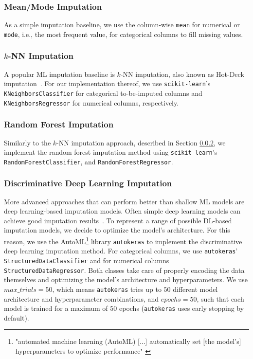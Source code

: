 \documentclass[utf8]{frontiersSCNS} %
\newcommand{\code}[1]{\texttt{#1}}
\begin{document}
\subsubsection{Mean/Mode Imputation}
\label{sec:simple_imputation}
%
As a simple imputation baseline, we use the column-wise \code{mean} for numerical or \code{mode}, i.e., the most frequent value,  for categorical columns to fill missing values.


\subsubsection{$k$-NN Imputation}
\label{sec:knKNN}
%
A popular ML imputation baseline is $k$-NN imputation, also known as Hot-Deck imputation~\citep{Batista2003}. For our implementation thereof, we use \code{scikit-learn}'s \code{KNeighborsClassifier} for categorical to-be-imputed columns and \code{KNeighborsRegressor} for numerical columns, respectively.


\subsubsection{Random Forest Imputation}
%
Similarly to the $k$-NN imputation approach, described in Section \ref{sec:knKNN}, we implement the random forest imputation method using \code{scikit-learn}'s \code{RandomForestClassifier}, and \code{RandomForestRegressor}.



\subsubsection{Discriminative Deep Learning Imputation}
\label{sec:dl_imputation}
%
More advanced approaches that can perform better than shallow ML models are deep learning-based imputation models. Often simple deep learning models can achieve good imputation results~\citep{Biessmann2018a}. To represent a range of possible DL-based imputation models, we decide to optimize the model's architecture. For this reason, we use the AutoML\footnote{"automated machine learning (AutoML) [...] automatically set [the model's] hyperparameters to optimize performance" \cite{AutoML}} library \code{autokeras} \citep{AutoKeras} to implement the discriminative deep learning imputation method. For categorical columns, we use \code{autokeras}' \code{StructuredDataClassifier} and for numerical columns \code{StructuredDataRegressor}. Both classes take care of properly encoding the data themselves and optimizing the model's architecture and hyperparameters. We use $max\_trials = 50$, which means \code{autokeras} tries up to $50$ different model architecture and hyperparameter combinations, and $epochs = 50$, such that each model is trained for a maximum of $50$ epochs (\code{autokeras} uses early stopping by default).
\end{document}
